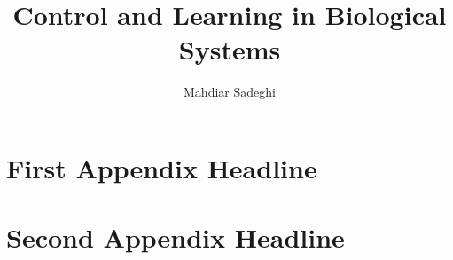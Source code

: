 \documentclass[PHD]{macro/neu}
\title{Control and Learning in Biological Systems}
\author{Mahdiar Sadeghi}
\begin{document}
\titlepage

\begin{frontmatter}



\tableofcontents
\listoffigures
\newpage\ssp
\listoftables




\end{frontmatter}
\pagestyle{headings}







\printbibliography

\appendix
\chapter{First Appendix Headline}
\chapter{Second Appendix Headline}
\printindex
\end{document}
